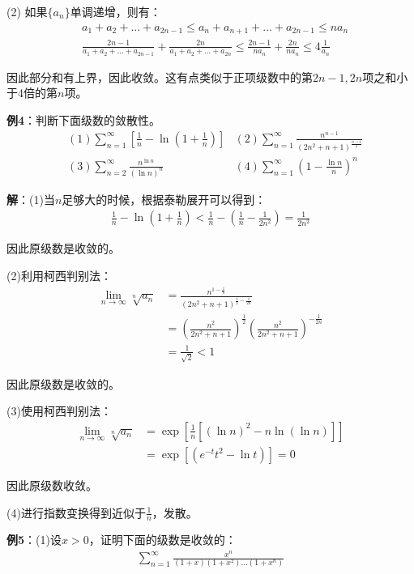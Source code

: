 \documentclass{ctexart}
\let\oldtextbf\textbf
\renewcommand{\textbf}[1]{\textcolor{brown!50!red}{\oldtextbf{#1}}}
\begin{document}
(2) 如果$\{a_n\}$单调递增，则有：
\begin{align*}
&a_1+a_2+...+a_{2n-1}\leq a_n+a_{n+1}+...+a_{2n-1}\leq na_n\\
&\frac{2n-1}{a_1+a_2+...+a_{2n-1}}+\frac{2n}{a_1+a_2+...+a_{2n}}\leq \frac{2n-1}{na_n}+\frac{2n}{na_n}\leq 4\frac{1}{a_n}
\end{align*}

因此部分和有上界，因此收敛。这有点类似于正项级数中的第$2n-1,2n$项之和小于4倍的第$n$项。

\textbf{\color{brown!50!red}例4}：判断下面级数的敛散性。
\begin{align*}
    &(1)\sum_{n=1}^\infty \left[\frac{1}{n}-\ln{(1+\frac{1}{n})}\right] &(2)\sum_{n=1}^\infty\frac{n^{n-1}}{(2n^2+n+1)^{\frac{n-1}{2}}}\\
    &(3)\sum_{n=2}^\infty \frac{n^{\ln n}}{(\ln n)^n} 
    &(4)\sum_{n=1}^\infty (1-\frac{\ln n}{n})^n
\end{align*}

\textbf{\color{brown!50!red}解}：(1)当$n$足够大的时候，根据泰勒展开可以得到：
\begin{align*}
    \frac{1}{n}-\ln(1+\frac{1}{n})<\frac{1}{n}-(\frac{1}{n}-\frac{1}{2n^2})=\frac{1}{2n^2}
\end{align*}

因此原级数是收敛的。

(2)利用柯西判别法：
\begin{align*}
    \lim_{n\to\infty}\sqrt[n]{a_n}&=\frac{n^{1-\frac{1}{n}}}{(2n^2+n+1)^{\frac{1}{2}-\frac{1}{2n}  }}
\\&=\left(\frac{n^2}{2n^2+n+1}\right)^{\frac{1}{2} } \left(\frac{n^2}{2n^2+n+1}\right)^{-\frac{1}{2n} }
\\&=\frac{1}{\sqrt{2}}<1 
\end{align*}


因此原级数是收敛的。

(3)使用柯西判别法：
\begin{align*}
    \lim_{n\to\infty}\sqrt[n]{a_n}&=\exp[\frac{1}{n} [(\ln n)^2-n\ln(\ln n)]]\\
&=\exp[(e^{-t}t^2-\ln t)]=0
\end{align*}

因此原级数收敛。

(4)进行指数变换得到近似于$\frac{1}{n}$，发散。

\textbf{\color{brown!50!red}例5}：(1)设$x>0$，证明下面的级数是收敛的：
\begin{align*}
    \sum_{n=1}^\infty \frac{x^n}{(1+x)(1+x^2)...(1+x^n)}
\end{align*}
\end{document}
